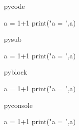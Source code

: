 \documentclass[a4paper]{article}
\begin{document}
pycode
\begin{pycode}
a = 1+1
print("a = ",a)
\end{pycode}

pysub
\begin{pysub}
a = 1+1
print("a = ",a)
\end{pysub}

pyblock
\begin{pyblock}
a = 1+1
print("a = ",a)
\end{pyblock}

pyconsole
\begin{pyconsole}
a = 1+1
print("a = ",a)
\end{pyconsole}
\end{document}
